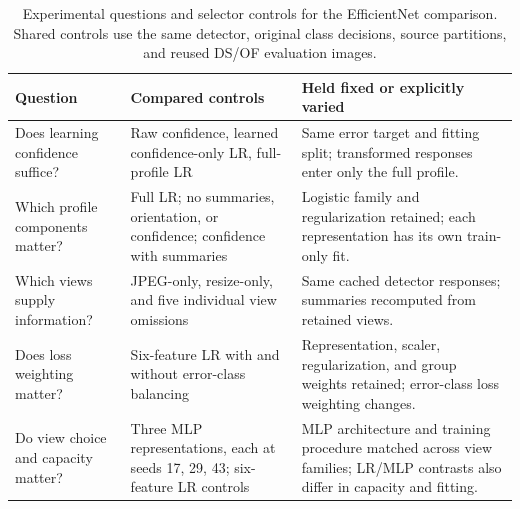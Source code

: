 \begin{table}[t]
\caption{Experimental questions and selector controls for the EfficientNet comparison. Shared controls use the same detector, original class decisions, source partitions, and reused DS/OF evaluation images.}
\label{tab:selector_questions}
\centering\small
\begin{tabular}{p{3.4cm}p{5.5cm}p{6.4cm}}
\toprule
Question & Compared controls & Held fixed or explicitly varied \\
\midrule
Does learning confidence suffice? & Raw confidence, learned confidence-only LR, full-profile LR & Same error target and fitting split; transformed responses enter only the full profile. \\
Which profile components matter? & Full LR; no summaries, orientation, or confidence; confidence with summaries & Logistic family and regularization retained; each representation has its own train-only fit. \\
Which views supply information? & JPEG-only, resize-only, and five individual view omissions & Same cached detector responses; summaries recomputed from retained views. \\
Does loss weighting matter? & Six-feature LR with and without error-class balancing & Representation, scaler, regularization, and group weights retained; error-class loss weighting changes. \\
Do view choice and capacity matter? & Three MLP representations, each at seeds 17, 29, 43; six-feature LR controls & MLP architecture and training procedure matched across view families; LR/MLP contrasts also differ in capacity and fitting. \\
\bottomrule
\end{tabular}
\end{table}
